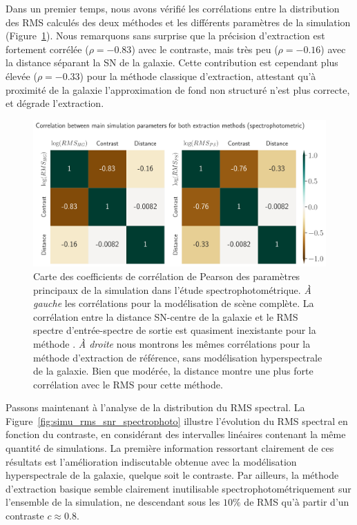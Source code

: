 \documentclass[../main/main.tex]{subfiles}
\begin{document}
Dans un premier temps, nous avons vérifié les corrélations entre la
distribution des RMS calculés des deux méthodes et les différents
paramètres de la simulation
(Figure~\ref{fig:corrheatmap_simuparams_spectrophoto}). Nous remarquons
sans surprise
que la précision d'extraction est fortement corrélée ($\rho=-0.83$) avec
le contraste, mais très peu ($\rho=-0.16$) avec la distance séparant la SN de la
galaxie. Cette contribution est cependant plus
élevée ($\rho=-0.33$) pour la méthode classique d'extraction, attestant
qu'à proximité de la galaxie l'approximation de fond non structuré n'est
plus correcte, et dégrade l'extraction.

\begin{figure}[ht]
  
  \includegraphics[width=\textwidth]{../figures/08_simu/corrheatmap_simu_params_spectrophoto.pdf}
    \caption[Corrélation des paramètres de la
    simulation (spectrophotométrique).]{Carte des coefficients de corrélation de Pearson des
      paramètres principaux de la
    simulation dans l'étude spectrophotométrique. \emph{À gauche} les
    corrélations pour la modélisation de scène complète. La corrélation
    entre la distance SN-centre de la galaxie et
    le RMS spectre d'entrée-spectre de sortie est quasiment inexistante pour la méthode
    \hypergal. \emph{À droite} nous montrons les mêmes corrélations pour
    la méthode d'extraction de référence, sans modélisation
    hyperspectrale de la galaxie. Bien que modérée, la
    distance montre une plus forte corrélation avec le RMS pour cette méthode.}\label{fig:corrheatmap_simuparams_spectrophoto}
\end{figure}


Passons maintenant à l'analyse de la distribution du RMS spectral.
La Figure~\ref{fig:simu_rms_snr_spectrophoto} illustre l'évolution du
RMS spectral en fonction du contraste, en considérant des intervalles
linéaires contenant la même quantité de simulations.
La première information ressortant clairement de ces résultats est
l'amélioration indiscutable obtenue avec la modélisation hyperspectrale
de la galaxie, quelque soit le contraste. Par ailleurs, la méthode d'extraction basique
semble clairement inutilisable spectrophotométriquement sur l'ensemble
de la simulation, ne descendant sous les $10\%$ de RMS qu'à partir d'un
contraste $c\approx0.8$.
\end{document}
